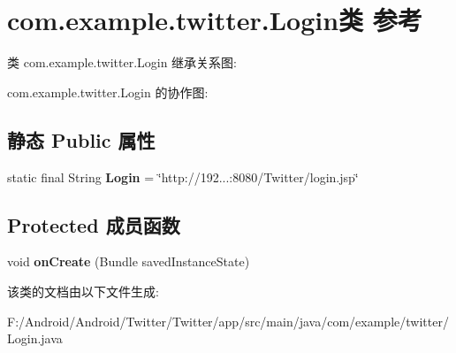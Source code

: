 \hypertarget{classcom_1_1example_1_1twitter_1_1_login}{}\section{com.\+example.\+twitter.\+Login类 参考}
\label{classcom_1_1example_1_1twitter_1_1_login}


类 com.\+example.\+twitter.\+Login 继承关系图\+:


com.\+example.\+twitter.\+Login 的协作图\+:
\subsection*{静态 Public 属性}
\begin{DoxyCompactItemize}
\item 
\mbox{\label{classcom_1_1example_1_1twitter_1_1_login_a9284df3d395cf523b692cbbab15dcb33}} 
static final String {\bfseries Login} = \char`\"{}http\+://192...\+:8080/Twitter/login.\+jsp\char`\"{}
\end{DoxyCompactItemize}
\subsection*{Protected 成员函数}
\begin{DoxyCompactItemize}
\item 
\mbox{\label{classcom_1_1example_1_1twitter_1_1_login_a4b837cb49b55993a066b1202bae1386b}} 
void {\bfseries on\+Create} (Bundle saved\+Instance\+State)
\end{DoxyCompactItemize}


该类的文档由以下文件生成\+:\begin{DoxyCompactItemize}
\item 
F\+:/\+Android/\+Android/\+Twitter/\+Twitter/app/src/main/java/com/example/twitter/Login.\+java\end{DoxyCompactItemize}
